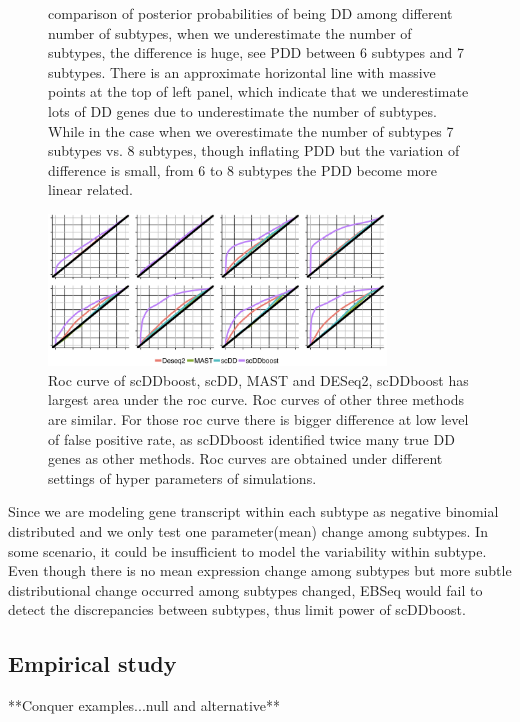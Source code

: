 \documentclass[11pt]{amsart}
\begin{document}
\begin{figure}[h]
  \endminipage
\caption{comparison of posterior probabilities of being DD among different number of subtypes, when we underestimate the number of subtypes, the difference is huge, see PDD between 6 subtypes and 7 subtypes. There is an approximate horizontal line with massive points at the top of left panel, which indicate that we underestimate lots of DD genes due to underestimate the number of subtypes. While in the case when we overestimate the number of subtypes 7 subtypes vs. 8 subtypes, though inflating PDD but the variation of difference is small, from 6 to 8 subtypes the PDD become more linear related.}
\end{figure}
\begin{figure}[H]
  \includegraphics[width = 0.8\textwidth]{Figs/roc.png}
  \caption{Roc curve of scDDboost, scDD, MAST and DESeq2, scDDboost has largest area under the roc curve. Roc curves of other three methods are similar. For those roc curve there is bigger difference at low level of false positive rate, as scDDboost identified twice many true DD genes as other methods.  Roc curves are obtained under different settings of hyper parameters of simulations.}
  \label{fig:5}
\end{figure}

Since we are modeling gene transcript within each subtype as negative binomial distributed and we only test one parameter(mean) change among subtypes. In some scenario, it could be insufficient to model the variability within subtype. Even though there is no mean expression change among subtypes but more subtle distributional change occurred among subtypes changed, EBSeq would fail to detect the discrepancies between subtypes, thus limit power of scDDboost.\\

\newpage
\subsection{Empirical study}

**Conquer examples...null and alternative**
\end{document}
